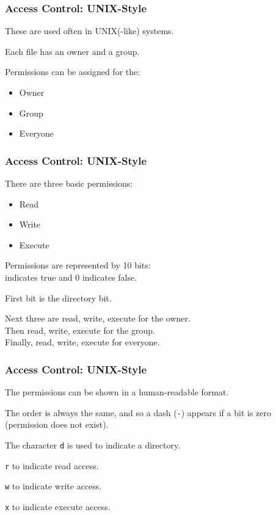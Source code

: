 \begin{frame}
\frametitle{Access Control: UNIX-Style}
\begin{changemargin}{1cm}

These are used often in UNIX(-like) systems.

Each file has an owner and a group. 

Permissions can be assigned for the:
\begin{itemize}
	\item Owner
	\item Group
	\item Everyone
\end{itemize}

\end{changemargin}
\end{frame}

\begin{frame}
\frametitle{Access Control: UNIX-Style}
\begin{changemargin}{1cm}

There are three basic permissions: 

\begin{itemize}
	\item Read
	\item Write
	\item Execute
\end{itemize}

Permissions are represented by 10 bits:\\ 
 indicates true and 0 indicates false.

First bit is the directory bit.

Next three are read, write, execute for the owner.\\
Then read, write, execute for the group.\\
Finally, read, write, execute for everyone.

\end{changemargin}
\end{frame}

\begin{frame}
\frametitle{Access Control: UNIX-Style}
\begin{changemargin}{1cm}

The permissions can be shown in a human-readable format.

The order is always the same, and so a dash (\texttt{-}) appears if a bit is zero (permission does not exist). 

The character \texttt{d} is used to indicate a directory.

\texttt{r} to indicate read access.

\texttt{w} to indicate write access.

\texttt{x} to indicate execute access.


\end{changemargin}
\end{frame}

